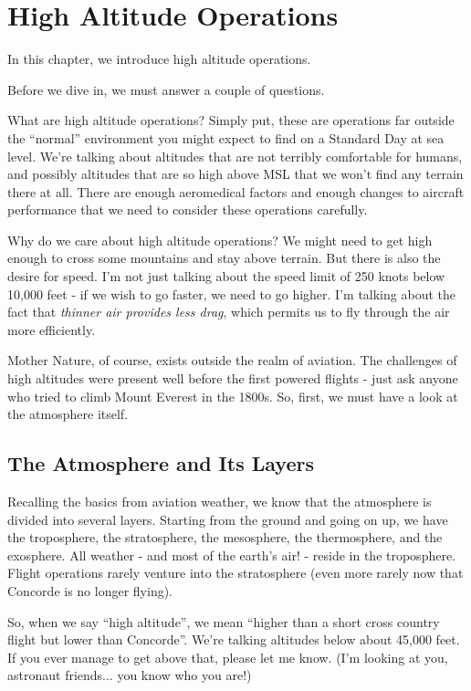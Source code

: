 \chapter{High Altitude Operations}

In this chapter, we introduce high altitude operations.

Before we dive in, we must answer a couple of questions.

What are high altitude operations? Simply put, these are operations far outside the ``normal'' environment you might expect to find on a Standard Day at sea level. We're talking about altitudes that are not terribly comfortable for humans, and possibly altitudes that are so high above MSL that we won't find any terrain there at all. There are enough aeromedical factors and enough changes to aircraft performance that we need to consider these operations carefully.

Why do we care about high altitude operations? We might need to get high enough to cross some mountains and stay above terrain. But there is also the desire for speed. I'm not just talking about the speed limit of 250 knots below 10,000 feet - if we wish to go faster, we need to go higher. I'm talking about the fact that \emph{thinner air provides less drag}, which permits us to fly through the air more efficiently.

Mother Nature, of course, exists outside the realm of aviation. The challenges of high altitudes were present well before the first powered flights - just ask anyone who tried to climb Mount Everest in the 1800s. So, first, we must have a look at the atmosphere itself.

\section{The Atmosphere and Its Layers}

Recalling the basics from aviation weather, we know that the atmosphere is divided into several layers. Starting from the ground and going on up, we have the troposphere, the stratosphere, the mesosphere, the thermosphere, and the exosphere. All weather - and most of the earth's air! - reside in the troposphere. Flight operations rarely venture into the stratosphere (even more rarely now that Concorde is no longer flying).

So, when we say ``high altitude'', we mean ``higher than a short cross country flight but lower than Concorde''. We're talking altitudes below about 45,000 feet. If you ever manage to get above that, please let me know. (I'm looking at you, astronaut friends... you know who you are!)

